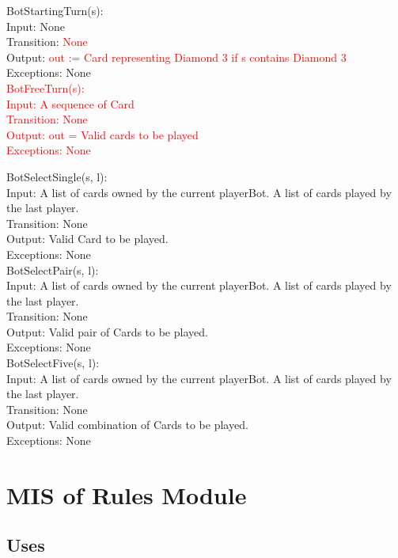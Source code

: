 \documentclass[12pt, titlepage]{article}
\begin{document}
\noindent BotStartingTurn(s):\\
Input: None\\
Transition: \textcolor{red}{None}\\
Output: \textcolor{red}{out := Card representing Diamond 3 if s contains Diamond 3}\\
Exceptions: None \\

\noindent \textcolor{red}{BotFreeTurn(s):\\
Input: A sequence of Card\\
Transition: None\\
Output: out = Valid cards to be played\\
Exceptions: None\\}

\noindent BotSelectSingle(s, l):\\
Input: A list of cards owned by the current playerBot. A list of cards played by the last player.\\
Transition: None\\
Output: Valid Card to be played. \\
Exceptions: None \\

\noindent BotSelectPair(s, l):\\
Input: A list of cards owned by the current playerBot. A list of cards played by the last player.\\
Transition: None\\
Output: Valid pair of Cards to be played. \\
Exceptions: None \\

\noindent BotSelectFive(s, l):\\
Input: A list of cards owned by the current playerBot. A list of cards played by the last player.\\
Transition: None\\
Output: Valid combination of Cards to be played. \\
Exceptions: None \\

\section{MIS of Rules Module}
\subsection{Uses}
\end{document}
